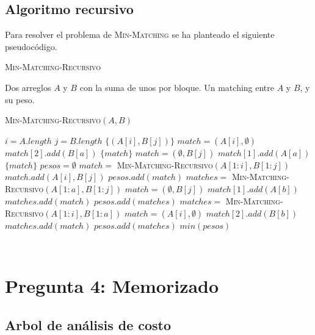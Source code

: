 \documentclass[conference]{IEEEtran}
\begin{document}
\subsection{Algoritmo recursivo}
Para resolver el problema de \textsc{Min-Matching} se ha planteado el siguiente pseudocódigo.
\begin{algorithm}
\caption{\textsc{Min-Matching-Recursivo}}
\begin{algorithmic}
\REQUIRE Dos arreglos $A$ y $B$ con la suma de unos por bloque.
\ENSURE Un matching entre $A$ y $B$, y su peso.
\begin{flushleft}
\textsc{Min-Matching-Recursivo}$(A,B)$
\end{flushleft}
    \STATE $i=A.length$
    \STATE $j=B.length$
        \RETURN $\{(A[i],B[j])\}$
            \STATE $match=(A[i],\emptyset)$
                \STATE $match[2].add(B[a])$
            \ENDFOR
            \RETURN $\{match\}$
        \ELSE
            \STATE $match=(\emptyset,B[j])$
                \STATE $match[1].add(A[a])$
            \ENDFOR
            \RETURN $\{match\}$
        \ENDIF
    \ELSE
        \STATE $pesos=\emptyset$
        \STATE $match=$ \textsc{Min-Matching-Recursivo}$(A[1:i],B[1:j])$
        \STATE $match.add(A[i],B[j])$
        \STATE $pesos.add(match)$
            \STATE $matches=$ \textsc{Min-Matching-Recursivo}$(A[1:a],B[1:j])$
            \STATE $match=(\emptyset,B[j])$
                \STATE $match[1].add(A[b])$
            \ENDFOR
            \STATE $matches.add(match)$
            \STATE $pesos.add(matches)$
        \ENDFOR
            \STATE $matches=$ \textsc{Min-Matching-Recursivo}$(A[1:i],B[1:a])$
            \STATE $match=(A[i],\emptyset)$
                \STATE $match[2].add(B[b])$
            \ENDFOR
            \STATE $matches.add(match)$
            \STATE $pesos.add(matches)$
        \ENDFOR
    \RETURN $min(pesos)$
    \ENDIF
\end{algorithmic}
\end{algorithm}
\verb| |\\
\section{Pregunta 4: Memorizado}

\subsection{Arbol de análisis de costo}
\end{document}
